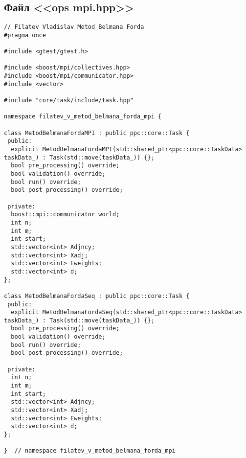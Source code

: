 \documentclass[a4paper, 14pt]{article}
\begin{document}
	
	\newpage
	\subsection*{\centering Файл <<ops mpi.hpp>>}
	\begin{verbatim}
// Filatev Vladislav Metod Belmana Forda
#pragma once

#include <gtest/gtest.h>

#include <boost/mpi/collectives.hpp>
#include <boost/mpi/communicator.hpp>
#include <vector>

#include "core/task/include/task.hpp"

namespace filatev_v_metod_belmana_forda_mpi {

class MetodBelmanaFordaMPI : public ppc::core::Task {
 public:
  explicit MetodBelmanaFordaMPI(std::shared_ptr<ppc::core::TaskData> taskData_) : Task(std::move(taskData_)) {};
  bool pre_processing() override;
  bool validation() override;
  bool run() override;
  bool post_processing() override;

 private:
  boost::mpi::communicator world;
  int n;
  int m;
  int start;
  std::vector<int> Adjncy;
  std::vector<int> Xadj;
  std::vector<int> Eweights;
  std::vector<int> d;
};

class MetodBelmanaFordaSeq : public ppc::core::Task {
 public:
  explicit MetodBelmanaFordaSeq(std::shared_ptr<ppc::core::TaskData> taskData_) : Task(std::move(taskData_)) {};
  bool pre_processing() override;
  bool validation() override;
  bool run() override;
  bool post_processing() override;

 private:
  int n;
  int m;
  int start;
  std::vector<int> Adjncy;
  std::vector<int> Xadj;
  std::vector<int> Eweights;
  std::vector<int> d;
};

}  // namespace filatev_v_metod_belmana_forda_mpi
	\end{verbatim}


	
	\newpage
\end{document}
